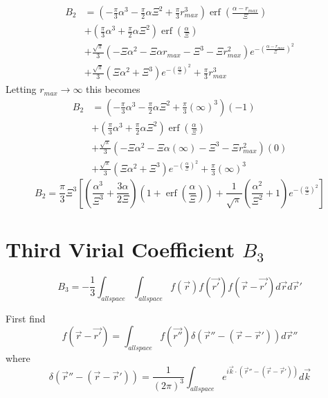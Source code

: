 \documentclass[double,12pt]{beavtex}
\begin{document}
\begin{align}
  B_2 &= \left(-\frac{\pi}{3}\alpha^3-\frac{\pi}{2}\alpha\Xi^2+\frac{\pi}{3}r_{max}^3\right)\operatorname{erf}\left(\frac{\alpha-r_{max}}{\Xi}\right) \\
      &+ \left(\frac{\pi}{3}\alpha^3+\frac{\pi}{2}\alpha\Xi^2\right)\operatorname{erf}\left(\frac{\alpha}{\Xi}\right) \\
      &+ \frac{\sqrt{\pi}}{3}\left(-\Xi\alpha^2-\Xi\alpha r_{max}-\Xi^3-\Xi r_{max}^2\right)e^{-{\left(\frac{\alpha-r_{max}}{\Xi}\right)^2}} \\
      &+ \frac{\sqrt{\pi}}{3}\left(\Xi\alpha^2+\Xi^3\right)e^{-\left(\frac{\alpha}{\Xi}\right)^2}+\frac{\pi}{3}r_{max}^3 
\end{align}
Letting $r_{max}\rightarrow\infty$ this becomes
\begin{align}
  B_2 &= \left(-\frac{\pi}{3}\alpha^3-\frac{\pi}{2}\alpha\Xi^2+\frac{\pi}{3}\left(\infty\right)^3\right)\left(-1\right) \\
      &+ \left(\frac{\pi}{3}\alpha^3+\frac{\pi}{2}\alpha\Xi^2\right)\operatorname{erf}\left(\frac{\alpha}{\Xi}\right) \\
      &+ \frac{\sqrt{\pi}}{3}\left(-\Xi\alpha^2-\Xi\alpha\left(\infty\right)-\Xi^3-\Xi r_{max}^2\right)\left(0\right) \\
      &+ \frac{\sqrt{\pi}}{3}\left(\Xi\alpha^2+\Xi^3\right)e^{-\left(\frac{\alpha}{\Xi}\right)^2}+\frac{\pi}{3}\left(\infty\right)^3 
\end{align}
\begin{equation}B_2 = \frac{\pi}{3}\Xi^3\left[\left(\frac{\alpha^3}{\Xi^3}+\frac{3\alpha}{2\Xi}\right)\left(1+\operatorname{erf}\left(\frac{\alpha}{\Xi}\right)\right)+\frac{1}{\sqrt{\pi}}\left(\frac{\alpha^2}{\Xi^2}+1\right)e^{-\left(\frac{\alpha}{\Xi}\right)^2}\right]\end{equation}

\section{Third Virial Coefficient $B_{3}$}

\begin{equation}\label{B3}B_3=-\frac{1}{3}\int_{allspace}\int_{allspace}f(\vec{r})f(\vec{r'})f(\vec{r}-\vec{r'})d\vec rd\vec r'\end{equation}

First find
\begin{equation}f(\vec{r}-\vec{r'})=\int_{allspace}f(\vec{r''})\delta(\vec{r}''-(\vec{r}-\vec{r}'))d\vec r'' \end{equation}
where
\begin{equation}{\delta}(\vec{r}''-(\vec{r}-\vec{r}'))={ \frac{1}{\left(2\pi\right)^3}\int_{allspace} e^{i\vec k\cdot (\vec{r}''-(\vec r-\vec r'))}d\vec{k}}\end{equation} 
\end{document}
